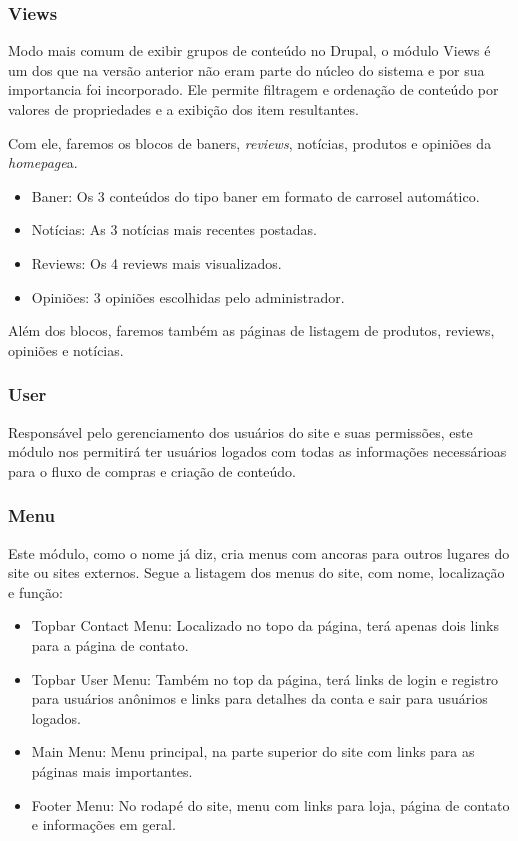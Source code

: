 \subsubsection{Views}
Modo mais comum de exibir grupos de conteúdo no Drupal, o módulo Views é um dos que na versão anterior não eram parte do núcleo do sistema e por sua importancia foi incorporado. Ele permite filtragem e ordenação de conteúdo por valores de propriedades e a exibição dos item resultantes. 

Com ele, faremos os blocos de baners, \textit{reviews}, notícias, produtos e opiniões da \textit{homepage}a.
\begin{itemize}
  \item Baner: Os 3 conteúdos do tipo baner em formato de carrosel automático.
  \item Notícias: As 3 notícias mais recentes postadas.
  \item Reviews: Os 4 reviews mais visualizados.
  \item Opiniões: 3 opiniões escolhidas pelo administrador.
\end{itemize}

Além dos blocos, faremos também as páginas de listagem de produtos, reviews, opiniões e notícias.

\subsubsection{User}
Responsável pelo gerenciamento dos usuários do site e suas permissões, este módulo nos permitirá ter usuários logados com todas as informações necessárioas para o fluxo de compras e criação de conteúdo.

\subsubsection{Menu}
Este módulo, como o nome já diz, cria menus com ancoras para outros lugares do site ou sites externos. Segue a listagem dos menus do site, com nome, localização e função:

\begin{itemize}
  \item Topbar Contact Menu: Localizado no topo da página, terá apenas dois links para a página de contato.
  \item Topbar User Menu: Também no top da página, terá links de login e registro para usuários anônimos e links para detalhes da conta e sair para usuários logados.
  \item Main Menu: Menu principal, na parte superior do site com links para as páginas mais importantes.
  \item Footer Menu: No rodapé do site, menu com links para loja, página de contato e informações em geral.
\end{itemize}



